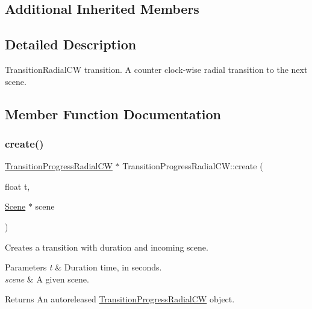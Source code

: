 \subsection*{Additional Inherited Members}


\subsection{Detailed Description}
Transition\+Radial\+CW transition. A counter clock-\/wise radial transition to the next scene. 

\subsection{Member Function Documentation}
\mbox{\label{classTransitionProgressRadialCW_a9a8060b9d6edba1e82d9a2b20993a87e}} 
\subsubsection{\texorpdfstring{create()}{create()}\hspace{0.1cm}{\footnotesize\ttfamily [1/2]}}
{\footnotesize\ttfamily \hyperlink{classTransitionProgressRadialCW}{Transition\+Progress\+Radial\+CW} $\ast$ Transition\+Progress\+Radial\+C\+W\+::create (\begin{DoxyParamCaption}\item[{float}]{t,  }\item[{\hyperlink{classScene}{Scene} $\ast$}]{scene }\end{DoxyParamCaption})\hspace{0.3cm}{\ttfamily [static]}}

Creates a transition with duration and incoming scene.


\begin{DoxyParams}{Parameters}
{\em t} & Duration time, in seconds. \\
\hline
{\em scene} & A given scene. \\
\hline
\end{DoxyParams}
\begin{DoxyReturn}{Returns}
An autoreleased \hyperlink{classTransitionProgressRadialCW}{Transition\+Progress\+Radial\+CW} object. 
\end{DoxyReturn}
\mbox{\label{classTransitionProgressRadialCW_a46e6aae49f5ca257501e11e80fcd7036}} 
